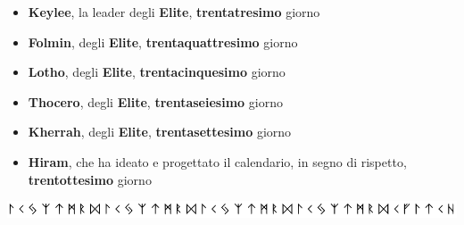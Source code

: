 \documentclass[10pt,twoside,onecolumn,openany]{book}
\begin{document}
\begin{multicols}{2}
\begin{itemize}
\item \textbf{Keylee}, la leader degli \textbf{Elite}, \textbf{trentatresimo} giorno
\item \textbf{Folmin}, degli \textbf{Elite}, \textbf{trentaquattresimo} giorno
\item \textbf{Lotho}, degli \textbf{Elite}, \textbf{trentacinquesimo} giorno
\item \textbf{Thocero}, degli \textbf{Elite}, \textbf{trentaseiesimo} giorno
\item \textbf{Kherrah}, degli \textbf{Elite}, \textbf{trentasettesimo} giorno
\item \textbf{Hiram}, che ha ideato e progettato il calendario, in segno di rispetto, \textbf{trentottesimo} giorno
\end{itemize}
\end{multicols}
\includegraphics[scale=0.735]{days}
\pagebreak
\end{document}
